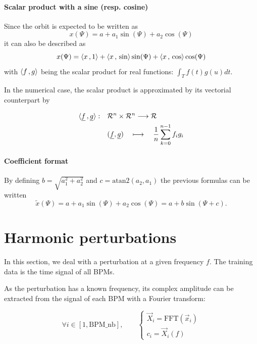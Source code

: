 \paragraph{Scalar product with a sine (resp. cosine)}
Since the orbit is expected to be written as
\begin{equation*}
x(\Psi) = a+ a_1 \sin(\Psi) + a_2 \cos(\Psi)
\end{equation*}
it can also be described as
\begin{equation}
x(\Psi) = \langle x {\,,\,} 1 \rangle + \langle x {\,,\,} \sin \rangle \sin(\Psi) + \langle x {\,,\,} \cos \rangle \cos(\Psi)
\end{equation}
with $\langle f {\,,\,} g \rangle$ being the scalar product for real functions: $\int_T f(t)g(u)dt$.

In the numerical case, the scalar product is approximated by its vectorial counterpart by

\begin{align*}
\langle \underline{f} {\,,\,} \underline{g} \rangle: \quad
 &\mathcal{R}^n \times \mathcal{R}^n \longrightarrow \mathcal{R} \\
 & (\underline{f},\underline{g}) \quad\longmapsto \quad \frac{1}{n}\sum\limits_{k=0}^{n-1} f_i g_i
\end{align*}

\paragraph{Coefficient format}
By defining $b = \sqrt{a_1^2+a_2^2}$ and $c = \mathrm{atan2}(a_2, a_1)$ the previous formulas can be written
\begin{equation*}
\tilde{x}(\Psi) = a + a_1 \sin(\Psi) + a_2 \cos(\Psi) = a + b \sin(\Psi + c).
\end{equation*} 

\section{Harmonic perturbations}
In this section, we deal with a perturbation at a given frequency $f$. The training data is the time signal of all BPMs.

As the perturbation has a known frequency, its complex amplitude can be extracted from the signal of each BPM with a Fourier transform:

\begin{equation}
\forall i \in [1, \mathrm{BPM\_nb}], \qquad 
\begin{cases}
\vec{X}_i = \mathrm{FFT}(\vec{x}_i) \\
c_i = \vec{X}_i(f)
\end{cases}
\end{equation}

